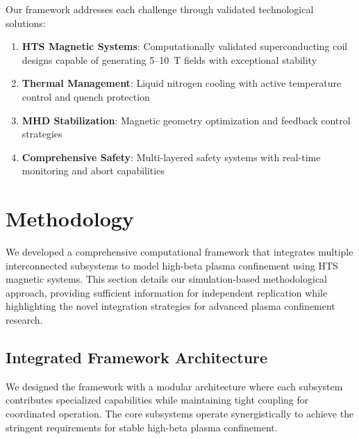 \documentclass[10pt,twocolumn]{article}
\begin{document}
Our framework addresses each challenge through validated technological solutions:
\begin{enumerate}
\item \textbf{HTS Magnetic Systems}: Computationally validated superconducting coil designs capable of generating 5--10~T fields with exceptional stability
\item \textbf{Thermal Management}: Liquid nitrogen cooling with active temperature control and quench protection
\item \textbf{MHD Stabilization}: Magnetic geometry optimization and feedback control strategies
\item \textbf{Comprehensive Safety}: Multi-layered safety systems with real-time monitoring and abort capabilities
\end{enumerate}

\section{Methodology}

We developed a comprehensive computational framework that integrates multiple interconnected subsystems to model high-beta plasma confinement using HTS magnetic systems. This section details our simulation-based methodological approach, providing sufficient information for independent replication while highlighting the novel integration strategies for advanced plasma confinement research.

\subsection{Integrated Framework Architecture}

We designed the framework with a modular architecture where each subsystem contributes specialized capabilities while maintaining tight coupling for coordinated operation. The core subsystems operate synergistically to achieve the stringent requirements for stable high-beta plasma confinement.
\end{document}
